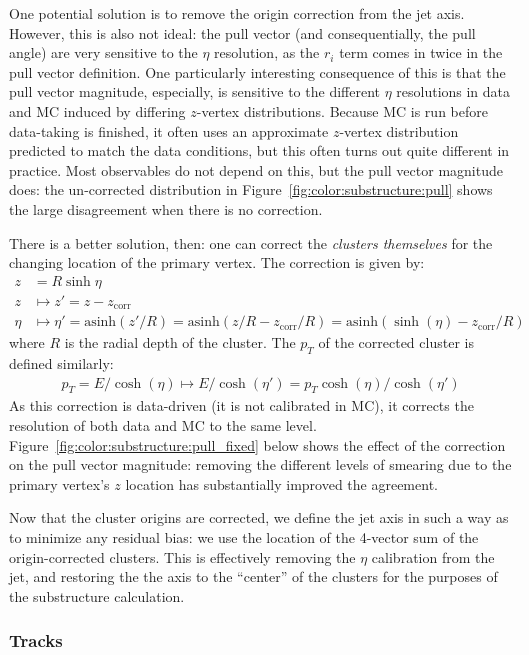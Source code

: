 One potential solution is to remove the origin correction from the jet axis. However, this is also not ideal: the pull vector (and consequentially, the pull angle) are very sensitive to the $\eta$ resolution, as the $r_i$ term comes in twice in the pull vector definition. One particularly interesting consequence of this is that the pull vector magnitude, especially, is sensitive to the different $\eta$ resolutions in data and MC induced by differing $z$-vertex distributions. Because MC is run before data-taking is finished, it often uses an approximate $z$-vertex distribution predicted to match the data conditions, but this often turns out quite different in practice. Most observables do not depend on this, but the pull vector magnitude does: the un-corrected distribution in Figure~\ref{fig:color:substructure:pull} shows the large disagreement when there is no correction.

There is a better solution, then: one can correct the \textit{clusters themselves} for the changing location of the primary vertex. The correction is given by: 
%
\begin{align}
z &= R\sinh\eta\nonumber\\
z &\mapsto z' = z - z_\text{corr}\nonumber\\
\eta &\mapsto \eta' = \text{asinh} (z'/R) = \text{asinh}(z/R - z_\text{corr}/R) = \text{asinh}(\sinh(\eta) - z_\text{corr}/R)
\end{align}
%
where $R$ is the radial depth of the cluster. The $p_T$ of the corrected cluster is defined similarly:
%
\begin{align}
p_T=E/\cosh(\eta)\mapsto E/\cosh(\eta')=p_T\cosh(\eta)/\cosh(\eta')
\end{align}
%
As this correction is data-driven (it is not calibrated in MC), it corrects the resolution of both data and MC to the same level. Figure~\ref{fig:color:substructure:pull_fixed} below shows the effect of the correction on the pull vector magnitude: removing the different levels of smearing due to the primary vertex's $z$ location has substantially improved the agreement.

Now that the cluster origins are corrected, we define the jet axis in such a way as to minimize any residual bias: we use the location of the 4-vector sum of the origin-corrected clusters. This is effectively removing the $\eta$ calibration from the jet, and restoring the the axis to the ``center'' of the clusters for the purposes of the substructure calculation.


\subsubsection{Tracks}

